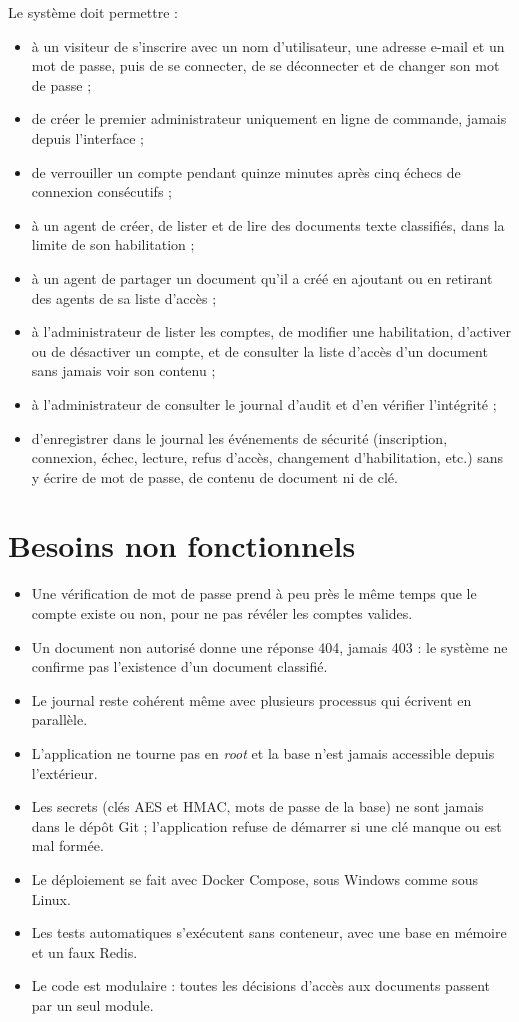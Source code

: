 \documentclass[12pt,a4paper]{report}
\begin{document}
Le système doit permettre :
\begin{itemize}
  \item à un visiteur de s'inscrire avec un nom d'utilisateur, une adresse e-mail et un mot de passe, puis de se connecter, de se déconnecter et de changer son mot de passe ;
  \item de créer le premier administrateur uniquement en ligne de commande, jamais depuis l'interface ;
  \item de verrouiller un compte pendant quinze minutes après cinq échecs de connexion consécutifs ;
  \item à un agent de créer, de lister et de lire des documents texte classifiés, dans la limite de son habilitation ;
  \item à un agent de partager un document qu'il a créé en ajoutant ou en retirant des agents de sa liste d'accès ;
  \item à l'administrateur de lister les comptes, de modifier une habilitation, d'activer ou de désactiver un compte, et de consulter la liste d'accès d'un document sans jamais voir son contenu ;
  \item à l'administrateur de consulter le journal d'audit et d'en vérifier l'intégrité ;
  \item d'enregistrer dans le journal les événements de sécurité (inscription, connexion, échec, lecture, refus d'accès, changement d'habilitation, etc.) sans y écrire de mot de passe, de contenu de document ni de clé.
\end{itemize}

\section{Besoins non fonctionnels}

\begin{itemize}
  \item Une vérification de mot de passe prend à peu près le même temps que le compte existe ou non, pour ne pas révéler les comptes valides.
  \item Un document non autorisé donne une réponse 404, jamais 403 : le système ne confirme pas l'existence d'un document classifié.
  \item Le journal reste cohérent même avec plusieurs processus qui écrivent en parallèle.
  \item L'application ne tourne pas en \emph{root} et la base n'est jamais accessible depuis l'extérieur.
  \item Les secrets (clés AES et HMAC, mots de passe de la base) ne sont jamais dans le dépôt Git ; l'application refuse de démarrer si une clé manque ou est mal formée.
  \item Le déploiement se fait avec Docker Compose, sous Windows comme sous Linux.
  \item Les tests automatiques s'exécutent sans conteneur, avec une base en mémoire et un faux Redis.
  \item Le code est modulaire : toutes les décisions d'accès aux documents passent par un seul module.
\end{itemize}
\end{document}
